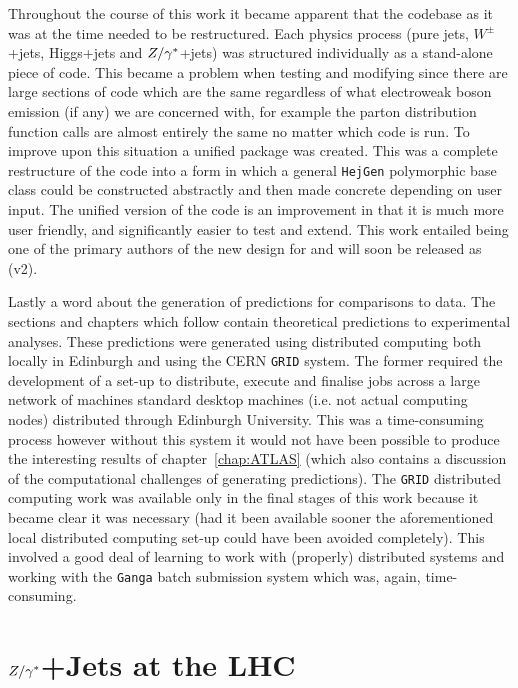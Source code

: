 	Throughout the course of this work it became apparent that the \hej
	codebase as it was at the time needed to be restructured.  Each physics
	process (pure jets, $W^\pm$+jets, Higgs+jets and $Z/\gamma^*$+jets) was structured
	individually as a stand-alone piece of code.  This became a problem when testing
	and modifying \HEJ since there are large sections of code which are the same
	regardless of what electroweak boson emission (if any) we are concerned with,
	for example the parton distribution function calls are almost entirely the same
	no matter which code is run.  To improve upon this situation a unified \HEJ
	package was created.  This was a complete restructure of the code into a form
	in which a general \texttt{HejGen} polymorphic base class could be
	constructed abstractly and then made concrete depending on user input.
	The unified version of the code is an improvement in that it is much more user
	friendly, and significantly easier to test and extend.  This work entailed
	being one of the primary authors of the new design for \hej and will soon be
	released as \HEJ (v2).

	Lastly a word about the generation of \hej predictions for comparisons to data.
	The sections and chapters which follow contain theoretical predictions to
	experimental analyses.  These predictions were generated using distributed
	computing both locally in Edinburgh and using the CERN \texttt{GRID} system.
	The former required the development of a set-up to distribute, execute and
	finalise jobs across a large network of machines standard desktop machines (i.e.
	not actual computing nodes) distributed through Edinburgh University.  This was
	a time-consuming process however without this system it would not have been
	possible to produce the interesting results of chapter~\ref{chap:ATLAS} (which
	also contains a discussion of the computational challenges of generating \HEJA
	predictions). The \texttt{GRID} distributed computing work was available only in
	the final stages of this work because it became clear it was necessary (had it
	been available sooner the aforementioned local distributed computing set-up could
	have been avoided completely).  This involved a good deal of learning to work with
	(properly) distributed systems and working with the \texttt{Ganga} batch submission
	system which was, again, time-consuming.

\section{$Z/\gamma^*$+Jets at the LHC}

